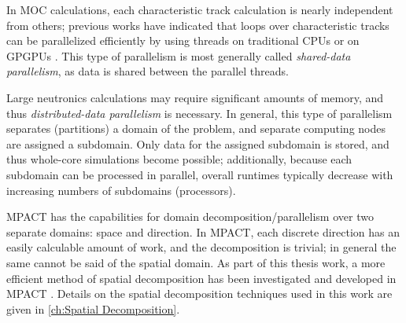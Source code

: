 {{        In \ac{MOC} calculations, each characteristic track calculation is nearly independent from others; previous works have indicated that loops over characteristic tracks can be parallelized efficiently by using threads on traditional \acp{CPU} \cite{Kochunas2013} or on \acp{GPGPU} \cite{Boyd2014}.
        This type of parallelism is most generally called \emph{shared-data parallelism}, as data is shared between the parallel threads.

        Large neutronics calculations may require significant amounts of memory, and thus \emph{distributed-data parallelism} is necessary.
        In general, this type of parallelism separates (partitions) a domain of the problem, and separate computing nodes are assigned a subdomain.
        Only data for the assigned subdomain is stored, and thus whole-core simulations become possible; additionally, because each subdomain can be processed in parallel, overall runtimes typically decrease with increasing numbers of subdomains (processors).

        MPACT has the capabilities for domain decomposition/parallelism over two separate domains: space and direction.
        In MPACT, each discrete direction has an easily calculable amount of work, and the decomposition is trivial; in general the same cannot be said of the spatial domain.
        As part of this thesis work, a more efficient method of spatial decomposition has been investigated and developed in MPACT \cite{Fitzgerald2019a}.
        Details on the spatial decomposition techniques used in this work are given in \cref{ch:Spatial Decomposition}.
    }
}